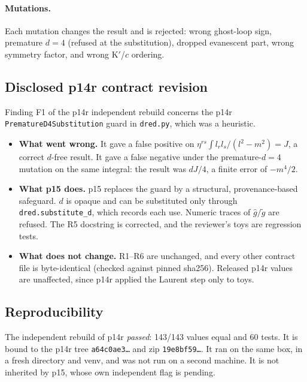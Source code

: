\paragraph{Mutations.} Each mutation changes the result and is rejected: wrong ghost-loop sign, premature $d=4$ (refused
at the substitution), dropped evanescent part, wrong symmetry factor, and wrong K$'$/$c$ ordering.



\subsection{Disclosed p14r contract revision}
Finding F1 of the p14r independent rebuild concerns the p14r \texttt{PrematureD4Substitution} guard in
\texttt{dred.py}, which was a heuristic.
\begin{itemize}
\item \textbf{What went wrong.} It gave a false positive on
$\eta^{rs}\!\int l_rl_s/(l^2-m^2)=J$, a correct $d$-free result. It gave a false negative under the premature-$d=4$
mutation on the same integral: the result was $dJ/4$, a finite error of $-m^4/2$.
\item \textbf{What p15 does.} p15 replaces the guard by a structural, provenance-based safeguard. $d$ is opaque and can
be substituted only through \texttt{dred.substitute\_d}, which records each use. Numeric traces of $\hat g/\tilde g$ are
refused. The R5 docstring is corrected, and the reviewer's toys are regression tests.
\item \textbf{What does not change.} R1--R6 are unchanged, and every other contract file is byte-identical (checked
against pinned sha256). Released p14r values are unaffected, since p14r applied the Laurent step only to toys.
\end{itemize}

\subsection{Reproducibility}
The independent rebuild of p14r \emph{passed}: 143/143 values equal and 60 tests. It is bound to the p14r tree
\texttt{a64c0ae3\ldots} and zip \texttt{19e8bf59\ldots}. It ran on the same box, in a fresh directory and venv, and was
not run on a second machine. It is not inherited by p15, whose own independent flag is pending.
